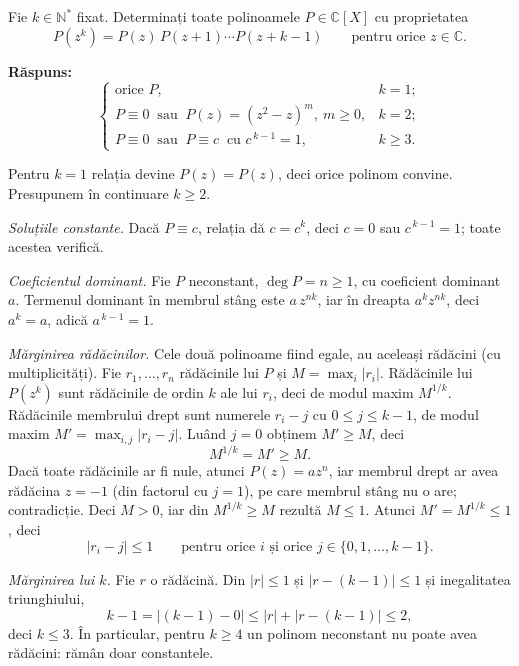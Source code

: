 \begin{problema}
Fie $k \in \mathbb{N}^{*}$ fixat. Determinați toate polinoamele
$P \in \mathbb{C}[X]$ cu proprietatea
\[
  P(z^{k}) = P(z)\,P(z+1)\cdots P(z+k-1) \qquad \text{pentru orice } z \in \mathbb{C}.
\]
\end{problema}

\noindent\textbf{Răspuns:}
\[
\begin{cases}
  \text{orice } P, & k=1;\\[2pt]
  P\equiv 0 \ \text{ sau }\ P(z)=(z^{2}-z)^{m},\ m\ge 0, & k=2;\\[2pt]
  P\equiv 0 \ \text{ sau }\ P\equiv c \ \text{ cu } c^{\,k-1}=1, & k\ge 3.
\end{cases}
\]

\begin{solutie}
Pentru $k=1$ relația devine $P(z)=P(z)$, deci orice polinom convine.
Presupunem în continuare $k\ge 2$.

\smallskip
\textit{Soluțiile constante.} Dacă $P\equiv c$, relația dă
$c=c^{k}$, deci $c=0$ sau $c^{\,k-1}=1$; toate acestea verifică.

\smallskip
\textit{Coeficientul dominant.} Fie $P$ neconstant, $\deg P=n\ge1$, cu
coeficient dominant $a$. Termenul dominant în membrul stâng este
$a\,z^{nk}$, iar în dreapta $a^{k}z^{nk}$, deci $a^{k}=a$, adică
$a^{\,k-1}=1$.

\smallskip
\textit{Mărginirea rădăcinilor.} Cele două polinoame fiind
egale, au aceleași rădăcini (cu multiplicități). Fie
$r_{1},\dots,r_{n}$ rădăcinile lui $P$ și $M=\max_{i}|r_{i}|$.
Rădăcinile lui $P(z^{k})$ sunt rădăcinile de ordin $k$ ale
lui $r_{i}$, deci de modul maxim $M^{1/k}$. Rădăcinile membrului
drept sunt numerele $r_{i}-j$ cu $0\le j\le k-1$, de modul maxim
$M'=\max_{i,j}|r_{i}-j|$. Luând $j=0$ obținem $M'\ge M$, deci
\[
  M^{1/k}=M'\ge M .
\]
Dacă toate rădăcinile ar fi nule, atunci $P(z)=az^{n}$, iar
membrul drept ar avea rădăcina $z=-1$ (din factorul cu $j=1$), pe
care membrul stâng nu o are; contradicție. Deci $M>0$, iar din
$M^{1/k}\ge M$ rezultă $M\le 1$. Atunci $M'=M^{1/k}\le 1$, deci
\[
  |r_{i}-j|\le 1 \qquad \text{pentru orice } i \text{ și orice } j\in\{0,1,\dots,k-1\}.
\]

\smallskip
\textit{Mărginirea lui $k$.} Fie $r$ o rădăcină. Din
$|r|\le 1$ și $|r-(k-1)|\le 1$ și inegalitatea triunghiului,
\[
  k-1 = |(k-1)-0| \le |r| + |r-(k-1)| \le 2,
\]
deci $k\le 3$. În particular, pentru $k\ge 4$ un polinom neconstant nu
poate avea rădăcini: rămân doar constantele.


\end{solutie}

